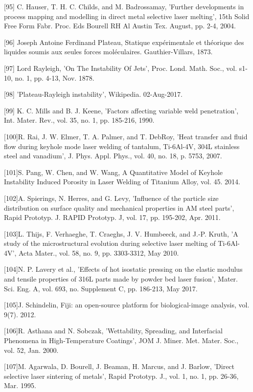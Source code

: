 \documentclass[10pt]{article}
\begin{document}
[95] C. Hauser, T. H. C. Childs, and M. Badrossamay, 'Further developments in process mapping and modelling in direct metal selective laser melting', 15th Solid Free Form Fabr. Proc. Eds Bourell RH Al Austin Tex. August, pp. 2-4, 2004.

[96] Joseph Antoine Ferdinand Plateau, Statique expérimentale et théorique des liquides soumis aux seules forces moléculaires. Gauthier-Villars, 1873.

[97] Lord Rayleigh, 'On The Instability Of Jets', Proc. Lond. Math. Soc., vol. s1-10, no. 1, pp. 4-13, Nov. 1878.

[98] 'Plateau-Rayleigh instability', Wikipedia. 02-Aug-2017.

[99] K. C. Mills and B. J. Keene, 'Factors affecting variable weld penetration', Int. Mater. Rev., vol. 35, no. 1, pp. 185-216, 1990.

[100]R. Rai, J. W. Elmer, T. A. Palmer, and T. DebRoy, 'Heat transfer and fluid flow during keyhole mode laser welding of tantalum, Ti-6Al-4V, 304L stainless steel and vanadium', J. Phys. Appl. Phys., vol. 40, no. 18, p. 5753, 2007.

[101]S. Pang, W. Chen, and W. Wang, A Quantitative Model of Keyhole Instability Induced Porosity in Laser Welding of Titanium Alloy, vol. 45. 2014.

[102]A. Spierings, N. Herres, and G. Levy, 'Influence of the particle size distribution on surface quality and mechanical properties in AM steel parts', Rapid Prototyp. J. RAPID Prototyp. J, vol. 17, pp. 195-202, Apr. 2011.

[103]L. Thijs, F. Verhaeghe, T. Craeghs, J. V. Humbeeck, and J.-P. Kruth, 'A study of the microstructural evolution during selective laser melting of Ti-6Al-4V', Acta Mater., vol. 58, no. 9, pp. 3303-3312, May 2010.

[104]N. P. Lavery et al., 'Effects of hot isostatic pressing on the elastic modulus and tensile properties of 316L parts made by powder bed laser fusion', Mater. Sci. Eng. A, vol. 693, no. Supplement C, pp. 186-213, May 2017.

[105]J. Schindelin, Fiji: an open-source platform for biological-image analysis, vol. 9(7). 2012.

[106]R. Asthana and N. Sobczak, 'Wettability, Spreading, and Interfacial Phenomena in High-Temperature Coatings', JOM J. Miner. Met. Mater. Soc., vol. 52, Jan. 2000.

[107]M. Agarwala, D. Bourell, J. Beaman, H. Marcus, and J. Barlow, 'Direct selective laser sintering of metals', Rapid Prototyp. J., vol. 1, no. 1, pp. 26-36, Mar. 1995.
\end{document}
